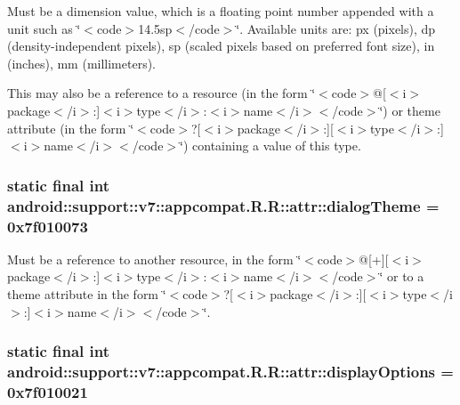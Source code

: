 Must be a dimension value, which is a floating point number appended with a unit such as \char`\"{}$<$code$>$14.5sp$<$/code$>$\char`\"{}. Available units are: px (pixels), dp (density-independent pixels), sp (scaled pixels based on preferred font size), in (inches), mm (millimeters). 

This may also be a reference to a resource (in the form \char`\"{}$<$code$>$@\mbox{[}$<$i$>$package$<$/i$>$:\mbox{]}$<$i$>$type$<$/i$>$:$<$i$>$name$<$/i$>$$<$/code$>$\char`\"{}) or theme attribute (in the form \char`\"{}$<$code$>$?\mbox{[}$<$i$>$package$<$/i$>$:\mbox{]}\mbox{[}$<$i$>$type$<$/i$>$:\mbox{]}$<$i$>$name$<$/i$>$$<$/code$>$\char`\"{}) containing a value of this type. \hypertarget{classandroid_1_1support_1_1v7_1_1appcompat_1_1_r_1_1attr_eb93b36e610e68f2303442bebdebe61d}{
\subsubsection[{dialogTheme}]{\setlength{\rightskip}{0pt plus 5cm}static final int android::support::v7::appcompat.R.R::attr::dialogTheme = 0x7f010073}}
\label{classandroid_1_1support_1_1v7_1_1appcompat_1_1_r_1_1attr_eb93b36e610e68f2303442bebdebe61d}


Must be a reference to another resource, in the form \char`\"{}$<$code$>$@\mbox{[}+\mbox{]}\mbox{[}$<$i$>$package$<$/i$>$:\mbox{]}$<$i$>$type$<$/i$>$:$<$i$>$name$<$/i$>$$<$/code$>$\char`\"{} or to a theme attribute in the form \char`\"{}$<$code$>$?\mbox{[}$<$i$>$package$<$/i$>$:\mbox{]}\mbox{[}$<$i$>$type$<$/i$>$:\mbox{]}$<$i$>$name$<$/i$>$$<$/code$>$\char`\"{}. \hypertarget{classandroid_1_1support_1_1v7_1_1appcompat_1_1_r_1_1attr_8958e4be96de96d8e11be11621b0a503}{
\subsubsection[{displayOptions}]{\setlength{\rightskip}{0pt plus 5cm}static final int android::support::v7::appcompat.R.R::attr::displayOptions = 0x7f010021}}
\label{classandroid_1_1support_1_1v7_1_1appcompat_1_1_r_1_1attr_8958e4be96de96d8e11be11621b0a503}


